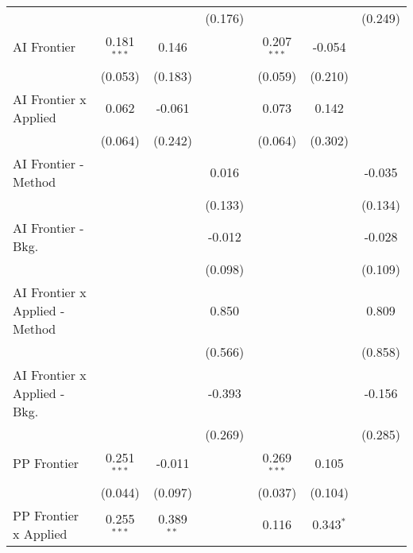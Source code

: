 \begin{tabular}{lcccccc}
                                  &                &               & (0.176)       &                &               & (0.249)\\   
   AI Frontier                    & 0.181$^{***}$  & 0.146         &               & 0.207$^{***}$  & -0.054        &   \\   
                                  & (0.053)        & (0.183)       &               & (0.059)        & (0.210)       &   \\   
   AI Frontier x Applied          & 0.062          & -0.061        &               & 0.073          & 0.142         &   \\   
                                  & (0.064)        & (0.242)       &               & (0.064)        & (0.302)       &   \\   
   AI Frontier - Method           &                &               & 0.016         &                &               & -0.035\\   
                                  &                &               & (0.133)       &                &               & (0.134)\\   
   AI Frontier - Bkg.             &                &               & -0.012        &                &               & -0.028\\   
                                  &                &               & (0.098)       &                &               & (0.109)\\   
   AI Frontier x Applied - Method &                &               & 0.850         &                &               & 0.809\\   
                                  &                &               & (0.566)       &                &               & (0.858)\\   
   AI Frontier x Applied - Bkg.   &                &               & -0.393        &                &               & -0.156\\   
                                  &                &               & (0.269)       &                &               & (0.285)\\   
   PP Frontier                    & 0.251$^{***}$  & -0.011        &               & 0.269$^{***}$  & 0.105         &   \\   
                                  & (0.044)        & (0.097)       &               & (0.037)        & (0.104)       &   \\   
   PP Frontier x Applied          & 0.255$^{***}$  & 0.389$^{**}$  &               & 0.116          & 0.343$^{*}$   &   \\   

\end{tabular}
